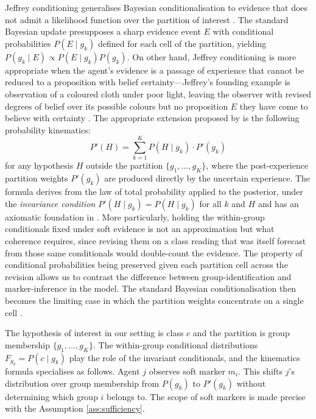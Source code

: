 \documentclass[pdflatex,sn-basic]{sn-jnl}
\theoremstyle{thmstyleone}
\numberwithin{proposition}{subsection}
\begin{document}
Jeffrey conditioning generalises Bayesian conditionalisation to evidence
that does not admit a likelihood function over the partition of interest
\citep{Jeffrey1965,Jeffrey2004}. The standard Bayesian update presupposes
a sharp evidence event $E$ with conditional probabilities $P(E \mid g_k)$
defined for each cell of the partition, yielding
$P(g_k \mid E) \propto P(E \mid g_k) P(g_k)$. On other hand, Jeffrey conditioning is more appropriate when the agent's evidence is a passage of experience that cannot be reduced to a proposition 
with belief certainty---Jeffrey's founding example is observation of a coloured
cloth under poor light, leaving the observer with revised degrees of
belief over its possible colours but no proposition $E$ they have come
to believe with certainty \citep[\S 11.1]{Jeffrey1965}. The appropriate extension proposed by 
\citet{Jeffrey1965} is the following probability kinematics:
\begin{equation}
  P'(H) = \sum_{k=1}^{K} P(H \mid g_k) \cdot P'(g_k)
  \label{eq:kinematics}
\end{equation}
for any hypothesis $H$ outside the partition $\{g_1, \ldots, g_K\}$,
where the post-experience partition weights $P'(g_k)$ are produced
directly by the uncertain experience. The formula derives from the law
of total probability applied to the posterior, under the
\emph{invariance condition} $P'(H \mid g_k) = P(H \mid g_k)$ for all $k$
and $H$ \citep[\S\S 11.3, 11.6]{Jeffrey1965} and has an axiomatic foundation in \citet{DiaconisZabell1982}. More particularly, holding the within-group conditionals fixed under soft evidence is not an approximation but what coherence requires, since revising them on a class reading that was itself forecast from those same conditionals would double-count the evidence. The property of conditional probabilities being preserved  given each partition cell across the revision allows us to contrast the difference between group-identification and marker-inference in the model. The standard Bayesian conditionalisation then becomes the limiting case in which the partition weights concentrate on a single cell \citep[\S 11.5]{Jeffrey1965}.

The hypothesis of interest in our setting is class $c$ and the partition
is group membership $\{g_1, \ldots, g_K\}$. The within-group
conditional distributions $F_{g_k} = P(c \mid g_k)$ play the role of the
invariant conditionals, and the kinematics formula specialises as
follows. Agent $j$ observes soft marker $m_i$. This shifts $j$'s
distribution over group membership from $P(g_k)$ to $P'(g_k)$ without
determining which group $i$ belongs to. The scope of soft markers is made precise with the Assumption \ref{ass:sufficiency}.
\end{document}
